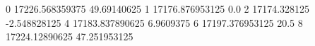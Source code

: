 0 17226.568359375 49.69140625
1 17176.876953125 0.0
2 17174.328125 -2.548828125
4 17183.837890625 6.9609375
6 17197.376953125 20.5
8 17224.12890625 47.251953125
